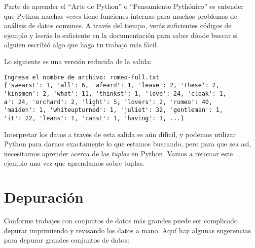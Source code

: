 Parte de aprender el ``Arte de Python'' o ``Pensamiento Pythónico'' es
entender que Python muchas veces tiene funciones internas para muchos
problemas de análisis de datos comunes. A través del tiempo, verás
suficientes códigos de ejemplo y leerás lo suficiente en la
documentación para saber dónde buscar si alguien escribió algo que haga
tu trabajo más fácil.

Lo siguiente es una versión reducida de la salida:

\begin{verbatim}
Ingresa el nombre de archivo: romeo-full.txt
{'swearst': 1, 'all': 6, 'afeard': 1, 'leave': 2, 'these': 2,
'kinsmen': 2, 'what': 11, 'thinkst': 1, 'love': 24, 'cloak': 1,
a': 24, 'orchard': 2, 'light': 5, 'lovers': 2, 'romeo': 40,
'maiden': 1, 'whiteupturned': 1, 'juliet': 32, 'gentleman': 1,
'it': 22, 'leans': 1, 'canst': 1, 'having': 1, ...}
\end{verbatim}

Interpretar los datos a través de esta salida es aún difícil, y podemos
utilizar Python para darnos exactamente lo que estamos buscando, pero
para que sea así, necesitamos aprender acerca de las \emph{tuplas} en
Python. Vamos a retomar este ejemplo una vez que aprendamos sobre
tuplas.

\hypertarget{depuraciuxf3n}{%
\section{Depuración}\label{depuraciuxf3n}}


Conforme trabajes con conjuntos de datos más grandes puede ser
complicado depurar imprimiendo y revisando los datos a mano. Aquí hay
algunas sugerencias para depurar grandes conjuntos de datos:

